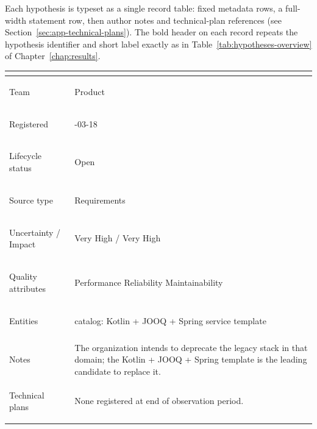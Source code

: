 Each hypothesis is typeset as a single record table: fixed metadata rows, a
full-width statement row, then author notes and technical-plan references (see
Section~\ref{sec:app-technical-plans}).
The bold header on each record repeats the hypothesis identifier and short label
exactly as in Table~\ref{tab:hypotheses-overview} of Chapter~\ref{chap:results}.

\newcommand{\hypoboxnine}[9]{%
  \par\addvspace{0.55\baselineskip}%
  \noindent\begingroup
  \small
  \setlength{\tabcolsep}{6pt}%
  \begin{tabular}{@{} >{\bfseries\raggedright\arraybackslash}p{3.4cm} >{\raggedright\arraybackslash}p{\dimexpr\textwidth-3.4cm-6\tabcolsep} @{}}
  \toprule
  \multicolumn{2}{@{}>{\raggedright\arraybackslash}p{\dimexpr\textwidth-4\tabcolsep}@{}}{%
    \large\textbf{#1}} \\
  \midrule
  Team & #2 \\
  Registered & #3 \\
  Lifecycle status & #4 \\
  Source type & #5 \\
  Uncertainty / Impact & #8 \\
  Quality attributes & #7 \\
  Entities & {\begingroup\ttfamily\small #6\endgroup} \\
  \addlinespace
  \multicolumn{2}{@{}>{\raggedright\arraybackslash}p{\dimexpr\textwidth-4\tabcolsep}@{}}{%
    \textbf{Statement}\par\vspace{0.3\baselineskip}%
    ``#9''\par
  } \\
  \midrule
}
\newcommand{\hypoboxtail}[2]{%
  Notes & #1 \\
  Technical plans & #2 \\
  \bottomrule
  \end{tabular}%
  \endgroup
  \par
}

\hypoboxnine%
  {H01 --- Kotlin/JOOQ/Spring template readiness}%
  {Product}%
  {2026-03-18}%
  {Open}%
  {Requirements}%
  {catalog: Kotlin + JOOQ + Spring service template}%
  {Performance \textbar{} Reliability \textbar{} Maintainability}%
  {Very High / Very High}%
  {The Kotlin + JOOQ + Spring service template is ready to scale for use in
   regulated financial product services, replacing a legacy functional-language
   stack.}%
\hypoboxtail%
  {The organization intends to deprecate the legacy stack in that domain; the
   Kotlin + JOOQ + Spring template is the leading candidate to replace it.}%
  {None registered at end of observation period.}

